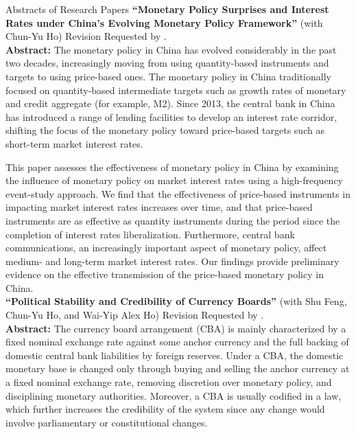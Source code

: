 \documentclass{resume_liang} %
\begin{document}
\begin{rSection}{Abstracts of Research Papers}
	\textbf{``Monetary Policy Surprises and Interest Rates under China's Evolving Monetary Policy Framework''} (with Chun-Yu Ho) Revision Requested by \textit{}.\vspace{0.1cm}\\ 
	\textbf{Abstract:} The monetary policy in China has evolved considerably in the past two decades, increasingly moving from using quantity-based instruments and targets to using price-based ones. The monetary policy in China traditionally focused on quantity-based intermediate targets such as growth rates of monetary and credit aggregate (for example, M2). Since 2013, the central bank in China has introduced a range of lending facilities to develop an interest rate corridor, shifting the focus of the monetary policy toward price-based targets such as short-term market interest rates.  
	
	This paper assesses the effectiveness of monetary policy in China by examining the influence of monetary policy on market interest rates using a high-frequency event-study approach. We find that the effectiveness of price-based instruments in impacting market interest rates increases over time, and that price-based instruments are as effective as quantity instruments during the period since the completion of interest rates liberalization. Furthermore, central bank communications, an increasingly important aspect of monetary policy, affect medium- and long-term market interest rates. Our findings provide preliminary evidence on the effective transmission of the price-based monetary policy in China. \\
	
	\textbf{``Political Stability and Credibility of Currency Boards''} (with Shu Feng, Chun-Yu Ho, and Wai-Yip Alex Ho) Revision Requested by \textit{}.\vspace{0.1cm}\\
	\textbf{Abstract:} The currency board arrangement (CBA) is mainly characterized by a fixed nominal exchange rate against some anchor currency and the full backing of domestic central bank liabilities by foreign reserves. Under a CBA, the domestic monetary base is changed only through buying and selling the anchor currency at a fixed nominal exchange rate, removing discretion over monetary policy, and disciplining monetary authorities. Moreover, a CBA is usually codified in a law, which further increases the credibility of the system since any change would involve parliamentary or constitutional changes.  
	

\end{rSection}
\end{document}
